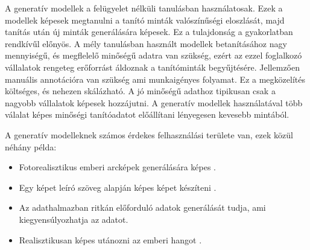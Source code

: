 A generatív modellek a felügyelet nélküli tanulásban használatosak. Ezek a modellek képesek megtanulni a tanító minták valószínűségi eloszlását, majd tanítás után új minták generálására képesek. Ez a tulajdonság a gyakorlatban rendkívűl előnyös. A mély tanulásban használt modellek betanításához nagy mennyiségű, és megflelelő minőségű adatra van szükség, ezért az ezzel foglalkozó vállalatok rengeteg erőforrást áldoznak a tanítóminták begyűjtésére. Jellemzően manuális annotációra van szükség ami munkaigényes folyamat. Ez a megközelítés költséges, és nehezen skálázható. A jó minőségű adathoz tipikusan csak a nagyobb vállalatok képesek hozzájutni. A generatív modellek használatával több válalat képes minőségi tanítóadatot előállítani lényegesen kevesebb mintából.

A generatív modelleknek számos érdekes felhasználási területe van, ezek közül néhány példa:
\begin{itemize} 
	\item Fotorealisztikus emberi arcképek generálására képes \cite{stylegan3}.
	\item Egy képet leíró szöveg alapján képes képet készíteni \cite{reed2016generative}.
	\item Az adathalmazban ritkán előforduló adatok generálását tudja, ami kiegyensúlyozhatja az adatot.
	\item Realisztikusan képes utánozni az emberi hangot \cite{jia2018transfer}.
\end{itemize}




